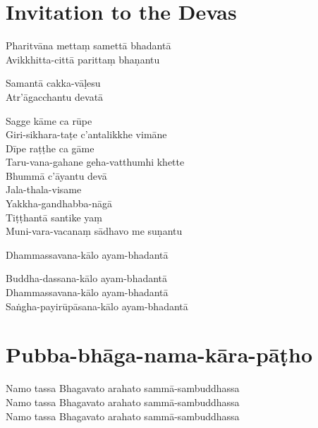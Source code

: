
\chapter{Invitation to the Devas}%


\begin{paritta}
%
Pharitvāna mettaṃ samettā bhadantā\\
Avikkhitta-cittā parittaṃ bhaṇantu

%
Samantā cakka-vāḷesu\\
Atr'āgacchantu devatā

Sagge kāme ca rūpe\\
Giri-sikhara-taṭe c'antalikkhe vimāne\\
Dīpe raṭṭhe ca gāme\\
Taru-vana-gahane geha-vatthumhi khette\\
Bhummā c'āyantu devā\\
Jala-thala-visame\\
Yakkha-gandhabba-nāgā\\
Tiṭṭhantā santike yaṃ\\
Muni-vara-vacanaṃ sādhavo me suṇantu

Dhammassavana-kālo ayam-bhadantā


Buddha-dassana-kālo ayam-bhadantā\\
Dhammassavana-kālo ayam-bhadantā\\
Saṅgha-payirūpāsana-kālo ayam-bhadantā
\end{paritta}

\chapter{Pubba-bhāga-nama-kāra-pāṭho}%


\begin{paritta}
Namo tassa Bhagavato arahato sammā-sambuddhassa\\
Namo tassa Bhagavato arahato sammā-sambuddhassa\\
Namo tassa Bhagavato arahato sammā-sambuddhassa
\end{paritta}

\clearpage

